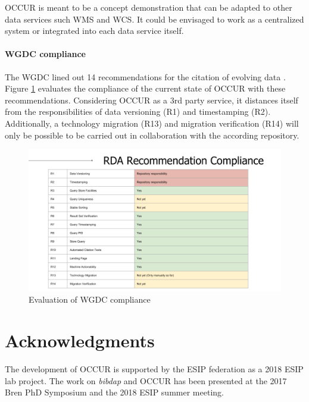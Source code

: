 \documentclass[letterpaper, twocolumn, parskip=half, fontsize=8pt, DIV=calc]{scrartcl}
\begin{document}

OCCUR is meant to be a concept demonstration that can be adapted to other data services such \gls{WMS} and \gls{WCS}. It could be envisaged to work as a centralized system or integrated into each data service itself.




\paragraph{WGDC compliance}
The \gls{WGDC} lined out 14 recommendations for the citation of evolving data \citep{Rauber2015}. Figure \ref{fig_WGDC_comparison} evaluates the compliance of the current state of OCCUR with these recommendations. Considering OCCUR as a 3rd party service, it distances itself from the responsibilities of data versioning (R1) and timestamping (R2). Additionally, a technology migration (R13) and migration verification (R14) will only be possible to be carried out in collaboration with the according repository. 


\begin{figure}[ht]
 \includegraphics[width=\columnwidth]{figures/comparison.png}
 \caption{Evaluation of WGDC compliance}
 \label{fig_WGDC_comparison}
\end{figure}





\section*{Acknowledgments}
The development of  \gls{OCCUR} is supported by the \gls{ESIP} federation as a 2018 \gls{ESIP} lab project. The work on \textit{bibdap} and \gls{OCCUR} has been presented at the 2017 Bren PhD Symposium and the 2018 \gls{ESIP} summer meeting.
\end{document}
